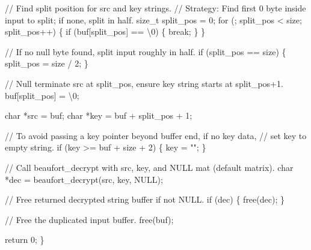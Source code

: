 \documentclass[
  a4paper,
]{scrreprt}
\newenvironment{Shaded}{\begin{snugshade}}{\end{snugshade}}
\newcommand{\CharTok}[1]{\textcolor[rgb]{0.00,0.50,0.00}{#1}}
\newcommand{\CommentTok}[1]{\textcolor[rgb]{0.41,0.41,0.41}{#1}}
\newcommand{\ControlFlowTok}[1]{\textcolor[rgb]{0.85,0.12,0.09}{#1}}
\newcommand{\DataTypeTok}[1]{\textcolor[rgb]{0.47,0.16,0.63}{#1}}
\newcommand{\DecValTok}[1]{\textcolor[rgb]{0.47,0.16,0.63}{#1}}
\newcommand{\NormalTok}[1]{\textcolor[rgb]{0.33,0.33,0.33}{#1}}
\newcommand{\OperatorTok}[1]{\textcolor[rgb]{0.00,0.46,0.62}{#1}}
\newcommand{\SpecialCharTok}[1]{\textcolor[rgb]{0.00,0.46,0.62}{#1}}
\newcommand{\StringTok}[1]{\textcolor[rgb]{0.00,0.50,0.00}{#1}}
\theoremstyle{definition}
\theoremstyle{remark}
\begin{document}
\begin{Shaded}
\begin{Highlighting}[numbers=left,,]
    \CommentTok{// Find split position for src and key strings.}
    \CommentTok{// Strategy: Find first 0 byte inside input to split; if none, split in half.}
    \DataTypeTok{size\_t}\NormalTok{ split\_pos }\OperatorTok{=} \DecValTok{0}\OperatorTok{;}
    \ControlFlowTok{for} \OperatorTok{(;}\NormalTok{ split\_pos }\OperatorTok{\textless{}}\NormalTok{ size}\OperatorTok{;}\NormalTok{ split\_pos}\OperatorTok{++)} \OperatorTok{\{}
        \ControlFlowTok{if} \OperatorTok{(}\NormalTok{buf}\OperatorTok{[}\NormalTok{split\_pos}\OperatorTok{]} \OperatorTok{==} \CharTok{\textquotesingle{}}\SpecialCharTok{\textbackslash{}0}\CharTok{\textquotesingle{}}\OperatorTok{)} \OperatorTok{\{}
            \ControlFlowTok{break}\OperatorTok{;}
        \OperatorTok{\}}
    \OperatorTok{\}}

    \CommentTok{// If no null byte found, split input roughly in half.}
    \ControlFlowTok{if} \OperatorTok{(}\NormalTok{split\_pos }\OperatorTok{==}\NormalTok{ size}\OperatorTok{)} \OperatorTok{\{}
\NormalTok{        split\_pos }\OperatorTok{=}\NormalTok{ size }\OperatorTok{/} \DecValTok{2}\OperatorTok{;}
    \OperatorTok{\}}

    \CommentTok{// Null terminate src at split\_pos, ensure key string starts at split\_pos+1.}
\NormalTok{    buf}\OperatorTok{[}\NormalTok{split\_pos}\OperatorTok{]} \OperatorTok{=} \CharTok{\textquotesingle{}}\SpecialCharTok{\textbackslash{}0}\CharTok{\textquotesingle{}}\OperatorTok{;}

    \DataTypeTok{char} \OperatorTok{*}\NormalTok{src }\OperatorTok{=}\NormalTok{ buf}\OperatorTok{;}
    \DataTypeTok{char} \OperatorTok{*}\NormalTok{key }\OperatorTok{=}\NormalTok{ buf }\OperatorTok{+}\NormalTok{ split\_pos }\OperatorTok{+} \DecValTok{1}\OperatorTok{;}

    \CommentTok{// To avoid passing a key pointer beyond buffer end, if no key data,}
    \CommentTok{// set key to empty string.}
    \ControlFlowTok{if} \OperatorTok{(}\NormalTok{key }\OperatorTok{\textgreater{}=}\NormalTok{ buf }\OperatorTok{+}\NormalTok{ size }\OperatorTok{+} \DecValTok{2}\OperatorTok{)} \OperatorTok{\{}
\NormalTok{        key }\OperatorTok{=} \StringTok{""}\OperatorTok{;}
    \OperatorTok{\}}

    \CommentTok{// Call beaufort\_decrypt with src, key, and NULL mat (default matrix).}
    \DataTypeTok{char} \OperatorTok{*}\NormalTok{dec }\OperatorTok{=}\NormalTok{ beaufort\_decrypt}\OperatorTok{(}\NormalTok{src}\OperatorTok{,}\NormalTok{ key}\OperatorTok{,}\NormalTok{ NULL}\OperatorTok{);}

    \CommentTok{// Free returned decrypted string buffer if not NULL.}
    \ControlFlowTok{if} \OperatorTok{(}\NormalTok{dec}\OperatorTok{)} \OperatorTok{\{}
\NormalTok{        free}\OperatorTok{(}\NormalTok{dec}\OperatorTok{);}
    \OperatorTok{\}}

    \CommentTok{// Free the duplicated input buffer.}
\NormalTok{    free}\OperatorTok{(}\NormalTok{buf}\OperatorTok{);}

    \ControlFlowTok{return} \DecValTok{0}\OperatorTok{;}
\OperatorTok{\}}
\end{Highlighting}
\end{Shaded}
\end{document}
